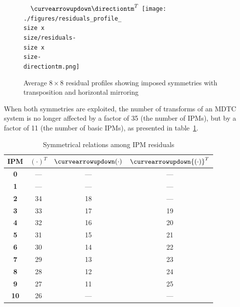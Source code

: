 \documentclass[11pt,a4paper,openright,twoside]{book}
\numberwithin{equation}{section} %
\numberwithin{figure}{section} %
\numberwithin{table}{section} %
\begin{document}
\begin{figure}[tb]
\begin{minipage}{0.6\textwidth}
{		
		$\quad\curvearrowupdown\directiontm^T$ %
		\texttt{[image: ./figures/residuals\_profile\_\\size x\\size/residuals-\\size x\\size-\\directiontm.png]}
		\par
}
\end{minipage}
	\caption[Average $8\times8$ residual profiles showing imposed symmetries]
	{Average $8\times8$ residual profiles showing imposed symmetries with
	transposition and horizontal mirroring}
	\label{fig:symmetry_transposed_mirror_8}
\end{figure}

When both symmetries are exploited, the number of transforms of an \ac{MDTC}
system is no longer affected by a factor of 35 (the number of \acp{IPM}), but
by a factor of 11 (the number of basic \acp{IPM}), as presented in
table~\ref{tab:relations_ipm_residuals}.

\begin{table}[tb]
	\centering
	\small
	\begin{tabular}{c|ccc}
	\bf IPM &
	${(\cdot)}^T$ &
	\bf $\curvearrowupdown(\cdot)$ &
	\bf $\curvearrowupdown{(\cdot)}^T$ \\[1ex]
	\hline\hline
	\bf 0       & ---           & ---    & ---    \\
	\bf 1       & ---           & ---    & ---    \\
	\bf 2       & 34            & 18     & ---    \\
	\bf 3       & 33            & 17     & 19     \\
	\bf 4       & 32            & 16     & 20     \\
	\bf 5       & 31            & 15     & 21     \\
	\bf 6       & 30            & 14     & 22     \\
	\bf 7       & 29            & 13     & 23     \\
	\bf 8       & 28            & 12     & 24     \\
	\bf 9       & 27            & 11     & 25     \\
	\bf 10      & 26            & ---    & ---    \\
	\end{tabular}
	\caption{Symmetrical relations among \ac{IPM} residuals}
	\label{tab:relations_ipm_residuals}
\end{table}
\end{document}
